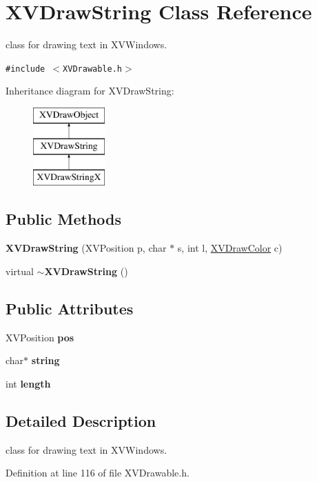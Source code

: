 \hypertarget{class_XVDrawString}{
\section{XVDraw\-String  Class Reference}
\label{XVDrawString}
}
class for drawing text in XVWindows. 


{\tt \#include $<$XVDrawable.h$>$}

Inheritance diagram for XVDraw\-String:\begin{figure}[H]
\begin{center}
\leavevmode
\includegraphics[height=3cm]{class_XVDrawString}
\end{center}
\end{figure}
\subsection*{Public Methods}
\begin{CompactItemize}
\item 
{\bf XVDraw\-String} (XVPosition p, char $\ast$ s, int l, \hyperlink{class_XVDrawColor}{XVDraw\-Color} c)
\item 
virtual {\bf $\sim$XVDraw\-String} ()
\end{CompactItemize}
\subsection*{Public Attributes}
\begin{CompactItemize}
\item 
XVPosition {\bf pos}
\item 
char$\ast$ {\bf string}
\item 
int {\bf length}
\end{CompactItemize}


\subsection{Detailed Description}
class for drawing text in XVWindows.





Definition at line 116 of file XVDrawable.h.

